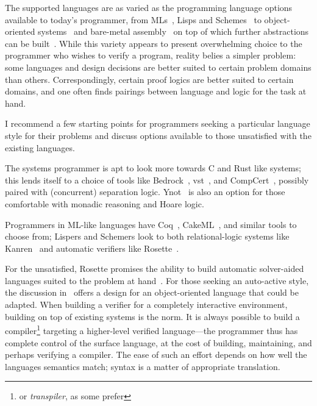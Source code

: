 The supported languages are as varied as the programming language options
available to today's programmer, from MLs~\cite{Coq,Kumar_2014}, Lisps and
Schemes~\cite{Torlak_2013} to object-oriented
systems~\cite{leino2008specification,leino2010dafny} and bare-metal
assembly~\cite{Chlipala_2011} on top of which further abstractions can be
built~\cite{Chlipala_2015}. While this variety appears to present overwhelming
choice to the programmer who wishes to verify a program, reality belies a
simpler problem: some languages and design decisions are better suited to
certain problem domains than others. Correspondingly, certain proof logics are
better suited to certain domains, and one often finds pairings between language
and logic for the task at hand.

I recommend a few starting points for programmers seeking a particular language
style for their problems and discuss options available to those unsatisfied with
the existing languages.

The systems programmer is apt to look more towards C and Rust like systems; this
lends itself to a choice of tools like Bedrock~\cite{Chlipala_2011},
\gls{vst}~\cite{VST}, and CompCert~\cite{Kastner-LBSSF-2017}, possibly paired
with (concurrent) separation logic. Ynot~\cite{Nanevski08ynot:reasoning} is also
an option for those comfortable with monadic reasoning and Hoare logic.

Programmers in ML-like languages have Coq~\cite{Coq}, CakeML~\cite{Kumar_2014},
and similar tools to choose from; Lispers and Schemers look to both
relational-logic systems like Kanren~\cite{Byrd_2009} and automatic verifiers
like Rosette~\cite{Rosette}.

For the unsatisfied, Rosette promises the ability to build automatic
solver-aided languages suited to the problem at hand~\cite{Torlak_2013}. For
those seeking an auto-active style, the discussion
in~\cite{leino2008specification} offers a design for an object-oriented language
that could be adapted. When building a verifier for a completely interactive
environment, building on top of existing systems is the norm. It is always
possible to build a compiler\footnote{or \emph{transpiler}, as some prefer}
targeting a higher-level verified language---the programmer thus has complete
control of the surface language, at the cost of building, maintaining, and
perhaps verifying a compiler. The ease of such an effort depends on how well the
languages semantics match; syntax is a matter of appropriate translation.
